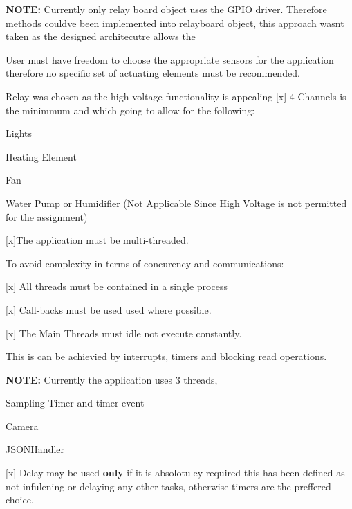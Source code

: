 {\bfseries N\+O\+TE\+:} Currently only relay board object uses the G\+P\+IO driver. Therefore methods could\textquotesingle{}ve been implemented into relayboard object, this approach wasn\textquotesingle{}t taken as the designed architecutre allows the

User must have freedom to choose the appropriate sensors for the application therefore no specific set of actuating elements must be recommended.

Relay was chosen as the high voltage functionality is appealing \mbox{[}x\mbox{]} 4 Channels is the minimmum and which going to allow for the following\+:
\begin{DoxyItemize}
\item Lights
\item Heating Element
\item Fan
\item Water Pump or Humidifier (Not Applicable Since High Voltage is not permitted for the assignment)
\end{DoxyItemize}


\begin{DoxyEnumerate}
\item \mbox{[}x\mbox{]}The application must be multi-\/threaded.
\item To avoid complexity in terms of concurency and communications\+:
\begin{DoxyEnumerate}
\item \mbox{[}x\mbox{]} All threads must be contained in a single process
\item \mbox{[}x\mbox{]} Call-\/backs must be used used where possible.
\item \mbox{[}x\mbox{]} The Main Threads must idle not execute constantly.
\end{DoxyEnumerate}
\end{DoxyEnumerate}

This is can be achievied by interrupts, timers and blocking read operations.

{\bfseries N\+O\+TE\+:} Currently the application uses 3 threads,
\begin{DoxyEnumerate}
\item Sampling Timer and timer event
\item \hyperlink{classCamera}{Camera}
\item J\+S\+O\+N\+Handler
\end{DoxyEnumerate}

\mbox{[}x\mbox{]} Delay may be used {\bfseries only} if it is absolotuley required this has been defined as not infulening or delaying any other tasks, otherwise timers are the preffered choice.


